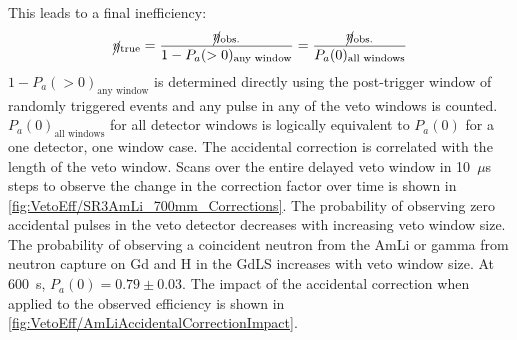 This leads to a final inefficiency:
\begin{equation}
	\cancel{\eta}_\text{true} = \frac{\cancel{\eta}_\text{obs.}}{1-P_a(>0)_{\text{any window}}}=\frac{\cancel{\eta}_\text{obs.}}{P_a(0)_{\text{all windows}}}
\end{equation}
$1-P_a(>0)_{\text{any window}}$ is determined directly using the post-trigger window of randomly triggered events and any pulse in any of the veto windows is counted. $P_a(0)_{\text{all windows}}$ for all detector windows is logically equivalent to $P_a(0)$ for a one detector, one window case.
The accidental correction is correlated with the length of the veto window. Scans over the entire delayed veto window in 10~$\mu$s steps to observe the change in the correction factor over time is shown in \autoref{fig:VetoEff/SR3AmLi_700mm_Corrections}. The probability of observing zero accidental pulses in the veto detector decreases with increasing veto window size. The probability of observing a coincident neutron from the AmLi or gamma from neutron capture on Gd and H in the GdLS increases with veto window size. At 600~\textmu s, $P_a(0)=0.79\pm0.03$. 
The impact of the accidental correction when applied to the observed efficiency is shown in \autoref{fig:VetoEff/AmLiAccidentalCorrectionImpact}.
\fi

